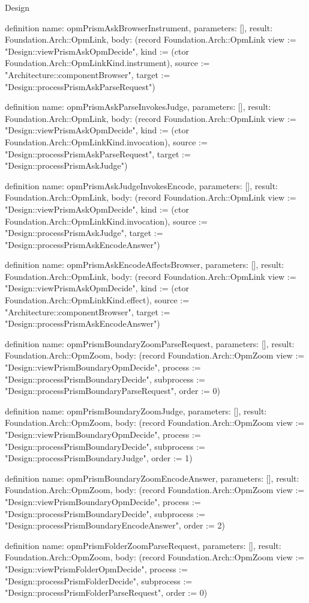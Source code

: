 \begin{lexlean}{Design}
\begin{semanticmodule}
definition{
  name: opmPrismAskBrowserInstrument,
  parameters: [],
  result: Foundation.Arch::OpmLink,
  body: (record Foundation.Arch::OpmLink {view := "Design::viewPrismAskOpmDecide", kind := (ctor Foundation.Arch::OpmLinkKind.instrument), source := "Architecture::componentBrowser", target := "Design::processPrismAskParseRequest"})
}

definition{
  name: opmPrismAskParseInvokesJudge,
  parameters: [],
  result: Foundation.Arch::OpmLink,
  body: (record Foundation.Arch::OpmLink {view := "Design::viewPrismAskOpmDecide", kind := (ctor Foundation.Arch::OpmLinkKind.invocation), source := "Design::processPrismAskParseRequest", target := "Design::processPrismAskJudge"})
}

definition{
  name: opmPrismAskJudgeInvokesEncode,
  parameters: [],
  result: Foundation.Arch::OpmLink,
  body: (record Foundation.Arch::OpmLink {view := "Design::viewPrismAskOpmDecide", kind := (ctor Foundation.Arch::OpmLinkKind.invocation), source := "Design::processPrismAskJudge", target := "Design::processPrismAskEncodeAnswer"})
}

definition{
  name: opmPrismAskEncodeAffectsBrowser,
  parameters: [],
  result: Foundation.Arch::OpmLink,
  body: (record Foundation.Arch::OpmLink {view := "Design::viewPrismAskOpmDecide", kind := (ctor Foundation.Arch::OpmLinkKind.effect), source := "Architecture::componentBrowser", target := "Design::processPrismAskEncodeAnswer"})
}

definition{
  name: opmPrismBoundaryZoomParseRequest,
  parameters: [],
  result: Foundation.Arch::OpmZoom,
  body: (record Foundation.Arch::OpmZoom {view := "Design::viewPrismBoundaryOpmDecide", process := "Design::processPrismBoundaryDecide", subprocess := "Design::processPrismBoundaryParseRequest", order := 0})
}

definition{
  name: opmPrismBoundaryZoomJudge,
  parameters: [],
  result: Foundation.Arch::OpmZoom,
  body: (record Foundation.Arch::OpmZoom {view := "Design::viewPrismBoundaryOpmDecide", process := "Design::processPrismBoundaryDecide", subprocess := "Design::processPrismBoundaryJudge", order := 1})
}

definition{
  name: opmPrismBoundaryZoomEncodeAnswer,
  parameters: [],
  result: Foundation.Arch::OpmZoom,
  body: (record Foundation.Arch::OpmZoom {view := "Design::viewPrismBoundaryOpmDecide", process := "Design::processPrismBoundaryDecide", subprocess := "Design::processPrismBoundaryEncodeAnswer", order := 2})
}

definition{
  name: opmPrismFolderZoomParseRequest,
  parameters: [],
  result: Foundation.Arch::OpmZoom,
  body: (record Foundation.Arch::OpmZoom {view := "Design::viewPrismFolderOpmDecide", process := "Design::processPrismFolderDecide", subprocess := "Design::processPrismFolderParseRequest", order := 0})
}


\end{semanticmodule}
\end{lexlean}
